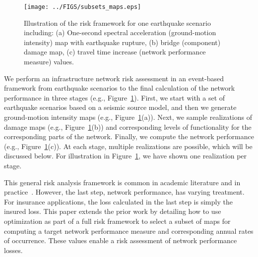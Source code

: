 

\begin{figure}
\centering
\texttt{[image: ../FIGS/subsets\_maps.eps]} 
\caption{Illustration of the risk framework for one earthquake scenario including: (a) One-second spectral acceleration  (ground-motion intensity) map with earthquake rupture, (b) bridge (component) damage map, (c) travel time increase (network performance measure) values. }
\label{fig:sample_pipeline}
\end{figure}

We perform an infrastructure network risk assessment in an event-based framework from earthquake scenarios to the final calculation of the network performance in three stages (e.g., Figure~\ref{fig:sample_pipeline}). First, we start with a set of earthquake scenarios based on a seismic source model, and then we generate ground-motion intensity maps (e.g., Figure~\ref{fig:sample_pipeline}{\color{red}(a)}).  Next, we sample realizations of  damage maps (e.g., Figure~\ref{fig:sample_pipeline}{\color{red}(b)}) and corresponding levels of functionality for the corresponding parts of the network.  Finally, we compute the network performance (e.g., Figure~\ref{fig:sample_pipeline}{\color{red}(c)}). At each stage, multiple realizations are possible, which will be discussed below. For illustration in Figure~\ref{fig:sample_pipeline}, we have shown one realization per stage.


This general risk analysis framework is common in academic literature and in practice~\cite{grossi_catastrophe_2005,johnson_planning_2005,jayaram_efficient_2010, han_probabilistic_2012,bommer_development_2002}. However, the last step, network performance, has varying treatment. For insurance applications, the loss calculated in the last step is simply the insured loss. This paper extends the prior work by detailing how to use optimization as part of a full risk framework to select a subset of maps for computing a target network performance measure and corresponding annual rates of occurrence.  These values enable a risk assessment of network performance losses.

